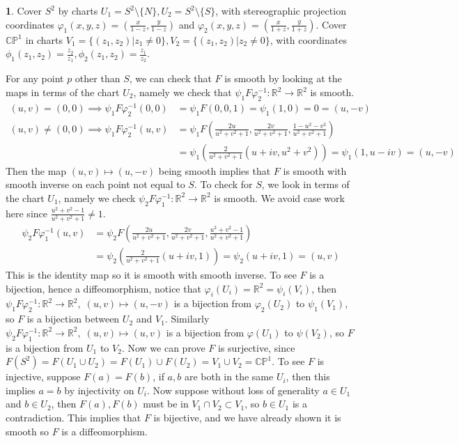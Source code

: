 \documentclass[10.5pt]{article}
\theoremstyle{definition}
\newtheorem{pb}{}
\newcommand{\set}[1]{\{#1\}}
\newcommand{\vp}{\varphi}
\begin{document}
    \begin{pb}

        Cover \(S^2\) by charts \(U_1 = S^2 \setminus \set{N}, U_2 = S^2 \setminus \set{S}\), with stereographic projection coordinates
        \(\varphi_1(x,y,z) = (\frac{x}{1-z},\frac{y}{1-z})\) and \(\varphi_2(x,y,z) = (\frac{x}{1+z},\frac{y}{1+z})\).
        Cover \(\mathbb{CP}^1\) in charts \(V_1 = \set{(z_1,z_2)\vert z_1 \neq 0}, V_2 = \set{(z_1,z_2)\vert z_2 \neq 0}\), with coordinates
        \(\phi_1(z_1,z_2) = \frac{z_2}{z_1}, \phi_2(z_1,z_2) = \frac{z_1}{z_2}\).

        For any point \(p\) other than \(S\), we can check that \(F\) is smooth by looking at the maps in terms of the chart \(U_2\),
        namely we check that \(\psi_1F\vp_2^{-1}: \mathbb{R}^2 \to \mathbb{R}^2\) is smooth.
        \begin{align*}
            (u,v) = (0,0) \implies \psi_1 F\vp_2^{-1}(0,0) &= \psi_1 F(0,0,1) = \psi_1(1,0) = 0 = (u,-v) \\
            (u,v) \neq (0,0) \implies \psi_1 F\vp_2^{-1}(u,v) &= \psi_1F(\frac{2u}{u^2 + v^2 + 1},\frac{2v}{u^2 + v^2 + 1},\frac{1-u^2-v^2}{u^2 + v^2 + 1}) \\
            &=\psi_1\left(\frac{2}{u^2+v^2+1}(u + iv, u^2+v^2)\right) = \psi_1(1,u-iv) = (u,-v)
        \end{align*}
        Then the map \((u,v) \mapsto (u,-v)\) being smooth implies that \(F\) is smooth with smooth inverse on each point not equal to \(S\).
        To check for \(S\), we look in terms of the chart \(U_1\), namely we check \(\psi_2F\vp_1^{-1}: \mathbb{R}^2 \to \mathbb{R}^2\) is smooth.
        We avoid case work here since \(\frac{u^2 + v^2 - 1}{u^2 + v^2 + 1} \neq 1\).
        \begin{align*}
            \psi_2F\vp_1^{-1}(u,v) &= \psi_2F\left(\frac{2u}{u^2+v^2+1},\frac{2v}{u^2+v^2+1},\frac{u^2+v^2-1}{u^2+v^2+1}\right) \\
            &= \psi_2\left(\frac{2}{u^2+v^2+1}(u+iv,1)\right) = \psi_2(u+iv,1) = (u,v)
        \end{align*}
        This is the identity map so it is smooth with smooth inverse. To see \(F\) is a bijection, hence a diffeomorphism, notice that
        \(\vp_i(U_i) = \mathbb{R}^2 = \psi_i(V_i)\), then \(\psi_1F\vp_2^{-1}: \mathbb{R}^2 \to \mathbb{R}^2, \; (u,v) \mapsto (u,-v)\) is a bijection from
        \(\vp_2(U_2)\) to \(\psi_1(V_1)\), so \(F\) is a bijection between \(U_2\) and \(V_1\). Similarly 
        \(\psi_2F\vp_1^{-1}: \mathbb{R}^2 \to \mathbb{R}^2, \; (u,v) \mapsto (u,v)\) is a bijection from \(\vp(U_1)\) to \(\psi(V_2)\),
        so \(F\) is a bijection from \(U_1\) to \(V_2\).
        Now we can prove \(F\) is surjective, since \(F(S^2) = F(U_1 \cup U_2) = F(U_1) \cup F(U_2) = V_1 \cup V_2 = \mathbb{CP}^1\). To see \(F\) is injective,
        suppose \(F(a) = F(b)\), if \(a,b\) are both in the same \(U_i\), then this implies \(a = b\) by injectivity on \(U_i\). Now suppose without loss of generality \(a \in U_1\)
        and \(b \in U_2\), then \(F(a), F(b)\) must be in \(V_1 \cap V_2 \subset V_1\), so \(b \in U_1\) is a contradiction. This implies that \(F\) is bijective, and we have already shown it is smooth
        so \(F\) is a diffeomorphism.
    \end{pb}
\end{document}
